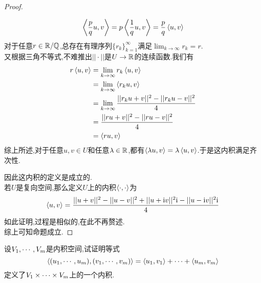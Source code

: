 \documentclass{ctexart}
\begin{document}
\begin{proof}
\begin{enumerate}[label=\tbf{(\arabic*)}]
            \[\left\langle{\dfrac pqu},{v}\right\rangle=p\left\langle{\dfrac1qu},{v}\right\rangle=\dfrac pq\left\langle{u},{v}\right\rangle\]
            对于任意$r\in\mathbb{R}/\mathbb{Q}$,总存在有理序列$\{r_k\}_{k=1}^{\infty}$满足$\displaystyle\lim_{k\to\infty}r_k=r$.\\
            又根据三角不等式,不难推出$||\cdot||$是$U\to\mathbb{R}$的连续函数.我们有
            \[\begin{aligned}
                r\left\langle{u},{v}\right\rangle
                &= \lim_{k\to\infty}r_k\left\langle{u},{v}\right\rangle \\
                &= \lim_{k\to\infty}\left\langle{r_ku},{v}\right\rangle \\
                &= \lim_{k\to\infty}\dfrac{||r_ku+v||^2-||r_ku-v||^2}{4} \\
                &= \dfrac{||ru+v||^2-||ru-v||^2}{4} \\
                &= \left\langle{ru},{v}\right\rangle
            \end{aligned}\]
            综上所述,对于任意$u,v\in U$和任意$\lambda\in\mathbb{R}$,都有$\left\langle{\lambda u},{v}\right\rangle=\lambda\left\langle{u},{v}\right\rangle$.于是这内积满足齐次性.
    \end{enumerate}
    因此这内积的定义是成立的.\\
    若$U$是复向空间,那么定义$U$上的内积$\left\langle{\cdot},{\cdot}\right\rangle$为
    \[\left\langle{u},{v}\right\rangle=\dfrac{||u+v||^2-||u-v||^2+||u+\text{i} v||^2\text{i}-||u-\text{i} v||^2\text{i}}{4}\]
    如此证明,过程是相似的,在此不再赘述.\\
    综上可知命题成立.
\end{proof}
\begin{problem}[29.]
    设${V}_1,\cdots,{V}_{m}$是内积空间,试证明等式
    \[\left\langle{({u}_1,\cdots,{u}_{m})},{({v}_1,\cdots,{v}_{m})}\right\rangle=\left\langle{u_1},{v_1}\right\rangle+\cdots+\left\langle{u_m},{v_m}\right\rangle\]
    定义了${V}_1\times\cdots\times{V}_{m}$上的一个内积.
\end{problem}
\end{document}
